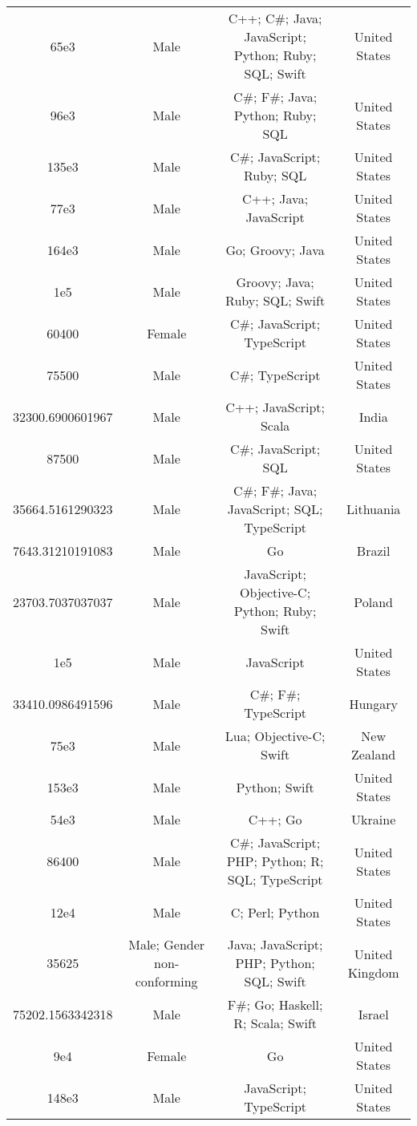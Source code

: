 \begin{center}
\begin{tabular}{ |c|c|c|c| }
65e3  &  Male  &  C++; C\#; Java; JavaScript; Python; Ruby; SQL; Swift  &  United States  \\ 
96e3  &  Male  &  C\#; F\#; Java; Python; Ruby; SQL  &  United States  \\ 
135e3  &  Male  &  C\#; JavaScript; Ruby; SQL  &  United States  \\ 
77e3  &  Male  &  C++; Java; JavaScript  &  United States  \\ 
164e3  &  Male  &  Go; Groovy; Java  &  United States  \\ 
1e5  &  Male  &  Groovy; Java; Ruby; SQL; Swift  &  United States  \\ 
60400  &  Female  &  C\#; JavaScript; TypeScript  &  United States  \\ 
75500  &  Male  &  C\#; TypeScript  &  United States  \\ 
32300.6900601967  &  Male  &  C++; JavaScript; Scala  &  India  \\ 
87500  &  Male  &  C\#; JavaScript; SQL  &  United States  \\ 
35664.5161290323  &  Male  &  C\#; F\#; Java; JavaScript; SQL; TypeScript  &  Lithuania  \\ 
7643.31210191083  &  Male  &  Go  &  Brazil  \\ 
23703.7037037037  &  Male  &  JavaScript; Objective-C; Python; Ruby; Swift  &  Poland  \\ 
1e5  &  Male  &  JavaScript  &  United States  \\ 
33410.0986491596  &  Male  &  C\#; F\#; TypeScript  &  Hungary  \\ 
75e3  &  Male  &  Lua; Objective-C; Swift  &  New Zealand  \\ 
153e3  &  Male  &  Python; Swift  &  United States  \\ 
54e3  &  Male  &  C++; Go  &  Ukraine  \\ 
86400  &  Male  &  C\#; JavaScript; PHP; Python; R; SQL; TypeScript  &  United States  \\ 
12e4  &  Male  &  C; Perl; Python  &  United States  \\ 
35625  &  Male; Gender non-conforming  &  Java; JavaScript; PHP; Python; SQL; Swift  &  United Kingdom  \\ 
75202.1563342318  &  Male  &  F\#; Go; Haskell; R; Scala; Swift  &  Israel  \\ 
9e4  &  Female  &  Go  &  United States  \\ 
148e3  &  Male  &  JavaScript; TypeScript  &  United States  \\ 

\end{tabular}
\end{center}
